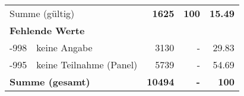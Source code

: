 \begin{longtable}{lXrrr}
     \midrule
     \multicolumn{2}{l}{Summe (gültig)} &
       \textbf{\num{1625}} &
     \textbf{\num{100}} &
       \textbf{\num[round-mode=places,round-precision=2]{15.49}} \\
     \multicolumn{5}{l}{\textbf{Fehlende Werte}}\\
       -998 &
       keine Angabe &
         \num{3130} &
        - &
         \num[round-mode=places,round-precision=2]{29.83} \\
       -995 &
       keine Teilnahme (Panel) &
         \num{5739} &
        - &
         \num[round-mode=places,round-precision=2]{54.69} \\
     \midrule
     \multicolumn{2}{l}{\textbf{Summe (gesamt)}} &
          \textbf{\num{10494}} &
        \textbf{-} &
        \textbf{\num{100}} \\
     \bottomrule
     \end{longtable}
     
